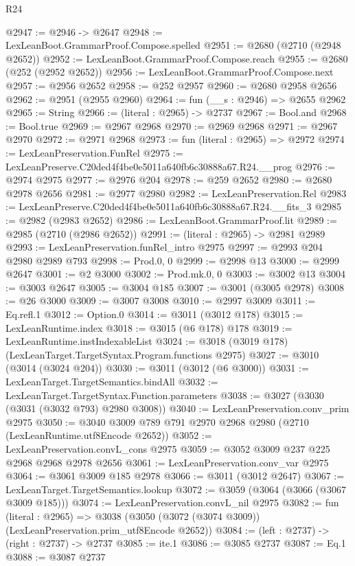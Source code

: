 \begin{lexlean}{R24}
\begin{coremodule}
@2947 := @2946 -> @2647
@2948 := LexLeanBoot.GrammarProof.Compose.spelled
@2951 := @2680 (@2710 (@2948 @2652))
@2952 := LexLeanBoot.GrammarProof.Compose.reach
@2955 := @2680 (@252 (@2952 @2652))
@2956 := LexLeanBoot.GrammarProof.Compose.next
@2957 := @2956 @2652
@2958 := @252 @2957
@2960 := @2680 @2958 @2656
@2962 := @2951 (@2955 @2960)
@2964 := fun (__s : @2946) => @2655 @2962
@2965 := String
@2966 := (literal : @2965) -> @2737
@2967 := Bool.and
@2968 := Bool.true
@2969 := @2967 @2968
@2970 := @2969 @2968
@2971 := @2967 @2970
@2972 := @2971 @2968
@2973 := fun (literal : @2965) => @2972
@2974 := LexLeanPreservation.FunRel
@2975 := LexLeanPreserve.C20ded4f4be0e5011a640fb6c30888a67.R24.__prog
@2976 := @2974 @2975
@2977 := @2976 @204
@2978 := @259 @2652
@2980 := @2680 @2978 @2656
@2981 := @2977 @2980
@2982 := LexLeanPreservation.Rel
@2983 := LexLeanPreserve.C20ded4f4be0e5011a640fb6c30888a67.R24.__fits_3
@2985 := @2982 (@2983 @2652)
@2986 := LexLeanBoot.GrammarProof.lit
@2989 := @2985 (@2710 (@2986 @2652))
@2991 := (literal : @2965) -> @2981 @2989
@2993 := LexLeanPreservation.funRel_intro @2975
@2997 := @2993 @204 @2980 @2989 @793
@2998 := Prod.{0, 0}
@2999 := @2998 @13
@3000 := @2999 @2647
@3001 := @2 @3000
@3002 := Prod.mk.{0, 0}
@3003 := @3002 @13
@3004 := @3003 @2647
@3005 := @3004 @185
@3007 := @3001 (@3005 @2978)
@3008 := @26 @3000
@3009 := @3007 @3008
@3010 := @2997 @3009
@3011 := Eq.refl.{1}
@3012 := Option.{0}
@3014 := @3011 (@3012 @178)
@3015 := LexLeanRuntime.index
@3018 := @3015 (@6 @178) @178
@3019 := LexLeanRuntime.instIndexableList
@3024 := @3018 (@3019 @178) (LexLeanTarget.TargetSyntax.Program.functions @2975)
@3027 := @3010 (@3014 (@3024 @204))
@3030 := @3011 (@3012 (@6 @3000))
@3031 := LexLeanTarget.TargetSemantics.bindAll
@3032 := LexLeanTarget.TargetSyntax.Function.parameters
@3038 := @3027 (@3030 (@3031 (@3032 @793) @2980 @3008))
@3040 := LexLeanPreservation.conv_prim @2975
@3050 := @3040 @3009 @789 @791 @2970 @2968 @2980 (@2710 (LexLeanRuntime.utf8Encode @2652))
@3052 := LexLeanPreservation.convL_cons @2975
@3059 := @3052 @3009 @237 @225 @2968 @2968 @2978 @2656
@3061 := LexLeanPreservation.conv_var @2975
@3064 := @3061 @3009 @185 @2978
@3066 := @3011 (@3012 @2647)
@3067 := LexLeanTarget.TargetSemantics.lookup
@3072 := @3059 (@3064 (@3066 (@3067 @3009 @185)))
@3074 := LexLeanPreservation.convL_nil @2975
@3082 := fun (literal : @2965) =>
  @3038 (@3050 (@3072 (@3074 @3009)) (LexLeanPreservation.prim_utf8Encode @2652))
@3084 := (left : @2737) -> (right : @2737) -> @2737
@3085 := ite.{1}
@3086 := @3085 @2737
@3087 := Eq.{1}
@3088 := @3087 @2737

\end{coremodule}
\end{lexlean}
